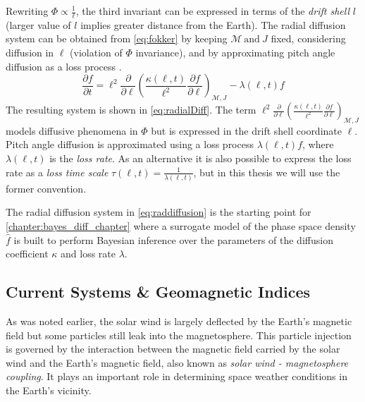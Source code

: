Rewriting $\Phi \propto \frac{1}{\ell}$, the third invariant can be expressed in terms of the 
\emph{drift shell} $l$ (larger value of $l$ implies greater distance from the Earth). The radial 
diffusion system can be obtained from \cref{eq:fokker} by keeping $\mathcal{M}\ \text{and} \ J$ 
fixed, considering diffusion in $\ell$ (violation of $\Phi$ invariance), and by approximating pitch 
angle diffusion as a loss process \citep{roederer2012dynamics,Walt1970}.  
%
\begin{equation}\label{eq:radialDiff}
    \frac{\partial{f}}{\partial{t}} = \ell^2 \frac{\partial}{\partial{\ell}} \left( 
        \frac{\kappa(\ell, t)}{\ell^{2}} \frac{\partial{f}}{\partial{\ell}}
    \right)_{\mathcal{M}, J} - \lambda(\ell,t) f
\end{equation}
%
The resulting system is shown in \cref{eq:radialDiff}. The term 
$\ell^2 \frac{\partial}{\partial{\ell}} \left( \frac{\kappa(\ell,t)}{\ell^{2}} 
\frac{\partial{f}}{\partial{\ell}}\right)_{\mathcal{M}, J}$ models diffusive phenomena in $\Phi$ 
but is expressed in the drift shell coordinate $\ell$. Pitch angle diffusion is approximated 
using a loss process $\lambda(\ell,t) f$, where $\lambda(\ell,t)$ is the \emph{loss rate}. As an 
alternative it is also possible to express the loss rate as a \emph{loss time scale} 
$\tau(\ell,t) = \frac{1}{\lambda(\ell,t)}$, but in this thesis we will use the former convention.

The radial diffusion system in \cref{eq:raddiffusion} is the starting point for 
\cref{chapter:bayes_diff_chapter} where a surrogate model of the phase space density $\hat{f}$ is 
built to perform Bayesian inference over the parameters of the diffusion coefficient $\kappa$ and 
loss rate $\lambda$.

\subsection{Current Systems \& Geomagnetic Indices}\label{sec:geoindex}

As was noted earlier, the solar wind is largely deflected by the Earth's magnetic field but some 
particles still leak into the magnetosphere. This particle injection is governed by the interaction 
between the magnetic field carried by the solar wind and the Earth's magnetic field, also known as 
\emph{solar wind - magnetosphere coupling}. It plays an important role in determining space weather 
conditions in the Earth's vicinity. 

